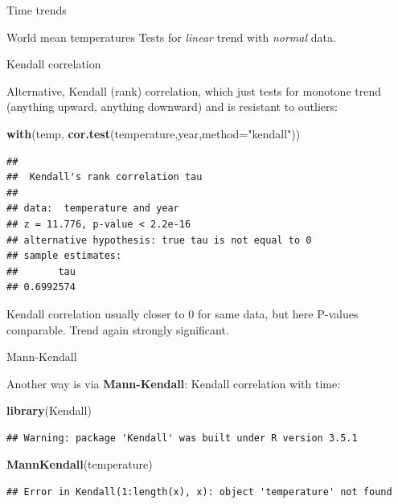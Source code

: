 \documentclass[ignorenonframetext,]{beamer}
\newenvironment{Shaded}{\begin{snugshade}}{\end{snugshade}}
\newcommand{\DataTypeTok}[1]{\textcolor[rgb]{0.13,0.29,0.53}{#1}}
\newcommand{\KeywordTok}[1]{\textcolor[rgb]{0.13,0.29,0.53}{\textbf{#1}}}
\newcommand{\NormalTok}[1]{#1}
\newcommand{\StringTok}[1]{\textcolor[rgb]{0.31,0.60,0.02}{#1}}
\begin{document}
\begin{frame}[fragile]{Time trends}
\begin{block}{World mean temperatures}
Tests for \emph{linear} trend with \emph{normal} data.

\end{block}

\begin{block}{Kendall correlation}

Alternative, Kendall (rank) correlation, which just tests for monotone
trend (anything upward, anything downward) and is resistant to outliers:

\begin{Shaded}
\begin{Highlighting}[]
\KeywordTok{with}\NormalTok{(temp, }\KeywordTok{cor.test}\NormalTok{(temperature,year,}\DataTypeTok{method=}\StringTok{"kendall"}\NormalTok{))}
\end{Highlighting}
\end{Shaded}

\begin{verbatim}
## 
##  Kendall's rank correlation tau
## 
## data:  temperature and year
## z = 11.776, p-value < 2.2e-16
## alternative hypothesis: true tau is not equal to 0
## sample estimates:
##       tau 
## 0.6992574
\end{verbatim}

Kendall correlation usually closer to 0 for same data, but here P-values
comparable. Trend again strongly significant.

\end{block}

\begin{block}{Mann-Kendall}

Another way is via \textbf{Mann-Kendall}: Kendall correlation with time:

\begin{Shaded}
\begin{Highlighting}[]
\KeywordTok{library}\NormalTok{(Kendall)}
\end{Highlighting}
\end{Shaded}

\begin{verbatim}
## Warning: package 'Kendall' was built under R version 3.5.1
\end{verbatim}

\begin{Shaded}
\begin{Highlighting}[]
\KeywordTok{MannKendall}\NormalTok{(temperature)}
\end{Highlighting}
\end{Shaded}

\begin{verbatim}
## Error in Kendall(1:length(x), x): object 'temperature' not found
\end{verbatim}


\end{block}
\end{frame}
\end{document}
